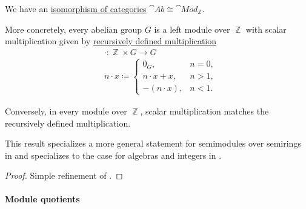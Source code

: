 \begin{proposition}\label{thm:abelian_group_is_module}
  We have an \hyperref[rem:category_similarity/isomorphism]{isomorphism of categories} \( \hyperref[def:abelian_group]{\cat{Ab}} \cong \hyperref[def:module]{\cat{Mod}_\BbbZ} \).

  More concretely, every abelian group \( G \) is a left module over \( \BbbZ \) with scalar multiplication given by \hyperref[con:additive_semigroup/multiplication]{recursively defined multiplication}
  \begin{equation}\label{eq:thm:abelian_group_is_module/operation}
    \begin{aligned}
      &\cdot: \BbbZ \times G \to G \\
      &n \cdot x \coloneqq \begin{cases}
        0_G,           &n = 0, \\
        n \cdot x + x, &n > 1, \\
        -(n \cdot x),  &n < 1.
      \end{cases}
    \end{aligned}
  \end{equation}

  Conversely, in every module over \( \BbbZ \), scalar multiplication matches the recursively defined multiplication.
\end{proposition}
\begin{comments}
  \item This result specializes a more general statement for semimodules over semirings in  and specializes to the case for algebras and integers in .
\end{comments}
\begin{proof}
  Simple refinement of .
\end{proof}

\paragraph{Module quotients}


